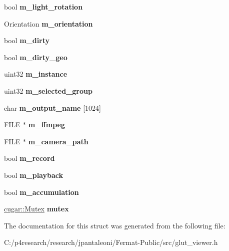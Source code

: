 \begin{DoxyCompactItemize}
bool {\bfseries m\+\_\+light\+\_\+rotation}
\item 
\mbox{\label{struct_glut_viewer_a55f53e58dc74308bbd02fd04c8b6b3ba}} 
Orientation {\bfseries m\+\_\+orientation}
\item 
\mbox{\label{struct_glut_viewer_a6963748b58cd9ddecadfdbd9233f09fa}} 
bool {\bfseries m\+\_\+dirty}
\item 
\mbox{\label{struct_glut_viewer_a57f261531422115760708337530dbff5}} 
bool {\bfseries m\+\_\+dirty\+\_\+geo}
\item 
\mbox{\label{struct_glut_viewer_a57ea8813c0cecd6e73be5adcc1fd5e37}} 
uint32 {\bfseries m\+\_\+instance}
\item 
\mbox{\label{struct_glut_viewer_af71356b0780e37d9eb42903ee4073e3f}} 
uint32 {\bfseries m\+\_\+selected\+\_\+group}
\item 
\mbox{\label{struct_glut_viewer_a3dae4869ce235493a5e1206619a43495}} 
char {\bfseries m\+\_\+output\+\_\+name} \mbox{[}1024\mbox{]}
\item 
\mbox{\label{struct_glut_viewer_a0976d324bc91c1ce89a9361298318c8d}} 
F\+I\+LE $\ast$ {\bfseries m\+\_\+ffmpeg}
\item 
\mbox{\label{struct_glut_viewer_a4a743b7a3aaaa00cece6836809f9be74}} 
F\+I\+LE $\ast$ {\bfseries m\+\_\+camera\+\_\+path}
\item 
\mbox{\label{struct_glut_viewer_a26c53d85482f5dad4c5cd14d63f964a8}} 
bool {\bfseries m\+\_\+record}
\item 
\mbox{\label{struct_glut_viewer_ac41a4b158f869094c622c4f7bb9d300d}} 
bool {\bfseries m\+\_\+playback}
\item 
\mbox{\label{struct_glut_viewer_a94c9dbd2ffe934f197192d8d7e6fac9c}} 
bool {\bfseries m\+\_\+accumulation}
\item 
\mbox{\label{struct_glut_viewer_aa62ec6a90f69184520edab863b117243}} 
\hyperlink{classcugar_1_1_mutex}{cugar\+::\+Mutex} {\bfseries mutex}
\end{DoxyCompactItemize}


The documentation for this struct was generated from the following file\+:\begin{DoxyCompactItemize}
\item 
C\+:/p4research/research/jpantaleoni/\+Fermat-\/\+Public/src/glut\+\_\+viewer.\+h\end{DoxyCompactItemize}
